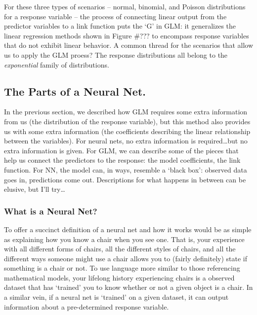 \documentclass[12pt]{article}
\begin{document}
For these three types of scenarios -- normal, binomial, and Poisson distributions for a response variable -- the process of connecting linear 
output from the predictor variables to a link function puts the `G' in GLM:  it generalizes the linear regression methods shown in Figure \#??? to
encompass response variables that do not exhibit linear behavior.  A common thread for the scenarios that allow us to apply the GLM proess?  The 
response distributions all belong to the \textit{exponential} family of distributions.


\subsection{The Parts of a Neural Net.}

In the previous section, we described how GLM requires some extra information from us (the distribution of the response variable), but this method
also provides us with some extra information (the coefficients describing the linear relationship between the variables).  For neural nets, no 
extra information is required\dots but no extra information is given.  For GLM, we can describe some of the pieces that help us connect the 
predictors to the response:  the model coefficients, the link function.  For NN, the model can, in ways, resemble a `black box':  observed data
goes in, predictions come out.  Descriptions for what happens in between can be elusive, but I'll try\dots

\subsubsection{What is a Neural Net?}

To offer a succinct definition of a neural net and how it works would be as simple as explaining how you know a chair when you see 
one.  That is, your experience with all different forms of chairs, all the different styles of chairs, and all the different ways someone might use
a chair allows you to (fairly definitely) state if something is a chair or not.  To use language more similar to those referencing mathematical
models, your lifelong history experiencing chairs is a observed dataset that has `trained' you to know whether or not a given object is a chair.  
In a similar vein, if a neural net is `trained' on a given dataset, it can output information about a pre-determined response variable.
\end{document}
